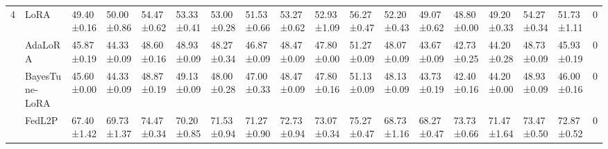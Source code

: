 \begin{table*}[t]
\begin{scriptsize}
{\begin{tabular}{c|l|l|l|l|l|l|l|l|l|l|l|l|l|l|l|l|c}
\multirow{5}{*}{4}  & LoRA                                   & 49.40±0.16                        & 50.00±0.86                        & 54.47±0.62                       & 53.33±0.41                       & 53.00±0.28                        & 51.53±0.66                       & 53.27±0.62                       & 52.93±1.09                       & 56.27±0.47                       & 52.20±0.43                        & 49.07±0.62                       & 48.80±0.00                        & 49.20±0.33                        & 54.27±0.34                       & 51.73±1.11                       & 0             \\ %
                    & AdaLoRA                              & 45.87±0.19                       & 44.33±0.09                       & 48.60±0.16                        & 48.93±0.09                       & 48.27±0.34                       & 46.87±0.09                       & 48.47±0.09                       & 47.80±0.00                        & 51.27±0.09                       & 48.07±0.09                       & 43.67±0.09                       & 42.73±0.25                       & 44.20±0.28                        & 48.73±0.09                       & 45.93±0.19                       & 0             \\ %
                    & BayesTune-LoRA                            & 45.60±0.00                        & 44.33±0.09                       & 48.87±0.19                       & 49.13±0.09                       & 48.00±0.28                        & 47.00±0.33                        & 48.47±0.09                       & 47.80±0.16                        & 51.13±0.09                       & 48.13±0.09                       & 43.73±0.19                       & 42.40±0.16                        & 44.20±0.00                        & 48.93±0.09                       & 46.00±0.16                        & 0             \\ %
                    & FedL2P                               & 67.40±1.42                        & 69.73±1.37                       & 74.47±0.34                       & 70.20±0.85                        & 71.53±0.94                       & 71.27±0.90                       & 72.73±0.94                       & 73.07±0.34                       & 75.27±0.47                       & 68.73±1.16                       & 68.27±0.47                       & 73.73±0.66                       & 71.47±1.64                       & 73.47±0.50                       & 72.87±0.52                       & 0             \\ %

\end{tabular}}
\end{scriptsize}
\end{table*}

